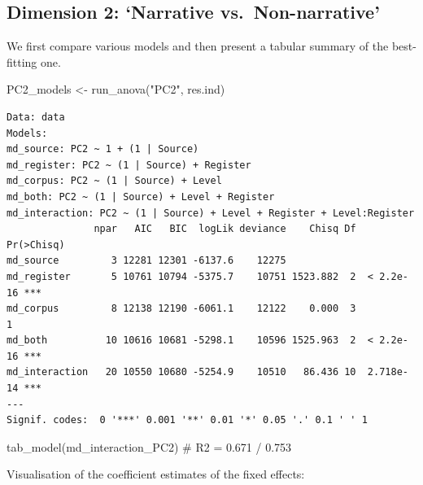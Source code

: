 \documentclass[
  letterpaper,
  DIV=11,
  numbers=noendperiod]{scrreprt}
\newenvironment{Shaded}{\begin{snugshade}}{\end{snugshade}}
\newcommand{\CommentTok}[1]{\textcolor[rgb]{0.37,0.37,0.37}{#1}}
\newcommand{\FunctionTok}[1]{\textcolor[rgb]{0.28,0.35,0.67}{#1}}
\newcommand{\NormalTok}[1]{\textcolor[rgb]{0.00,0.23,0.31}{#1}}
\newcommand{\OtherTok}[1]{\textcolor[rgb]{0.00,0.23,0.31}{#1}}
\newcommand{\StringTok}[1]{\textcolor[rgb]{0.13,0.47,0.30}{#1}}
\begin{document}
\subsection{Dimension 2: `Narrative
vs.~Non-narrative'}\label{dimension-2-narrative-vs.-non-narrative}

We first compare various models and then present a tabular summary of
the best-fitting one.

\begin{Shaded}
\begin{Highlighting}[]
\NormalTok{PC2\_models }\OtherTok{\textless{}{-}} \FunctionTok{run\_anova}\NormalTok{(}\StringTok{"PC2"}\NormalTok{, res.ind)}
\end{Highlighting}
\end{Shaded}

\begin{verbatim}
Data: data
Models:
md_source: PC2 ~ 1 + (1 | Source)
md_register: PC2 ~ (1 | Source) + Register
md_corpus: PC2 ~ (1 | Source) + Level
md_both: PC2 ~ (1 | Source) + Level + Register
md_interaction: PC2 ~ (1 | Source) + Level + Register + Level:Register
               npar   AIC   BIC  logLik deviance    Chisq Df Pr(>Chisq)    
md_source         3 12281 12301 -6137.6    12275                           
md_register       5 10761 10794 -5375.7    10751 1523.882  2  < 2.2e-16 ***
md_corpus         8 12138 12190 -6061.1    12122    0.000  3          1    
md_both          10 10616 10681 -5298.1    10596 1525.963  2  < 2.2e-16 ***
md_interaction   20 10550 10680 -5254.9    10510   86.436 10  2.718e-14 ***
---
Signif. codes:  0 '***' 0.001 '**' 0.01 '*' 0.05 '.' 0.1 ' ' 1
\end{verbatim}

\begin{Shaded}
\begin{Highlighting}[]
\FunctionTok{tab\_model}\NormalTok{(md\_interaction\_PC2) }\CommentTok{\# R2 = 0.671 / 0.753}
\end{Highlighting}
\end{Shaded}

Visualisation of the coefficient estimates of the fixed effects:
\end{document}
